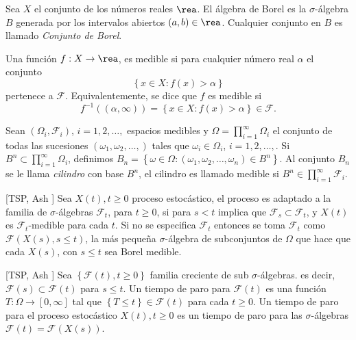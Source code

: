 \begin{Def}\label{Cto.Borel}
Sea $X$ el conjunto de los n\'umeros reales $\rea$. El \'algebra
de Borel es la $\sigma$-\'algebra $B$ generada por los intervalos
abiertos $\left(a,b\right)\in\rea$. Cualquier conjunto en $B$ es
llamado {\em Conjunto de Borel}.
\end{Def}

\begin{Def}\label{Funcion.Medible}
Una funci\'on $f:X\rightarrow\rea$, es medible si para cualquier
n\'umero real $\alpha$ el conjunto
\[\left\{x\in X:f\left(x\right)>\alpha\right\}\]
pertenece a $\mathcal{F}$. Equivalentemente, se dice que $f$ es
medible si
\[f^{-1}\left(\left(\alpha,\infty\right)\right)=\left\{x\in X:f\left(x\right)>\alpha\right\}\in\mathcal{F}.\]
\end{Def}


\begin{Def}\label{Def.Cilindros}
Sean $\left(\Omega_{i},\mathcal{F}_{i}\right)$, $i=1,2,\ldots,$
espacios medibles y $\Omega=\prod_{i=1}^{\infty}\Omega_{i}$ el
conjunto de todas las sucesiones
$\left(\omega_{1},\omega_{2},\ldots,\right)$ tales que
$\omega_{i}\in\Omega_{i}$, $i=1,2,\ldots,$. Si
$B^{n}\subset\prod_{i=1}^{\infty}\Omega_{i}$, definimos
$B_{n}=\left\{\omega\in\Omega:\left(\omega_{1},\omega_{2},\ldots,\omega_{n}\right)\in
B^{n}\right\}$. Al conjunto $B_{n}$ se le llama {\em cilindro} con
base $B^{n}$, el cilindro es llamado medible si
$B^{n}\in\prod_{i=1}^{\infty}\mathcal{F}_{i}$.
\end{Def}


\begin{Def}\label{Def.Proc.Adaptado}[TSP, Ash \cite{RBA}]
Sea $X\left(t\right),t\geq0$ proceso estoc\'astico, el proceso es
adaptado a la familia de $\sigma$-\'algebras $\mathcal{F}_{t}$,
para $t\geq0$, si para $s<t$ implica que
$\mathcal{F}_{s}\subset\mathcal{F}_{t}$, y $X\left(t\right)$ es
$\mathcal{F}_{t}$-medible para cada $t$. Si no se especifica
$\mathcal{F}_{t}$ entonces se toma $\mathcal{F}_{t}$ como
$\mathcal{F}\left(X\left(s\right),s\leq t\right)$, la m\'as
peque\~na $\sigma$-\'algebra de subconjuntos de $\Omega$ que hace
que cada $X\left(s\right)$, con $s\leq t$ sea Borel medible.
\end{Def}


\begin{Def}\label{Def.Tiempo.Paro}[TSP, Ash \cite{RBA}]
Sea $\left\{\mathcal{F}\left(t\right),t\geq0\right\}$ familia
creciente de sub $\sigma$-\'algebras. es decir,
$\mathcal{F}\left(s\right)\subset\mathcal{F}\left(t\right)$ para
$s\leq t$. Un tiempo de paro para $\mathcal{F}\left(t\right)$ es
una funci\'on $T:\Omega\rightarrow\left[0,\infty\right]$ tal que
$\left\{T\leq t\right\}\in\mathcal{F}\left(t\right)$ para cada
$t\geq0$. Un tiempo de paro para el proceso estoc\'astico
$X\left(t\right),t\geq0$ es un tiempo de paro para las
$\sigma$-\'algebras
$\mathcal{F}\left(t\right)=\mathcal{F}\left(X\left(s\right)\right)$.
\end{Def}


